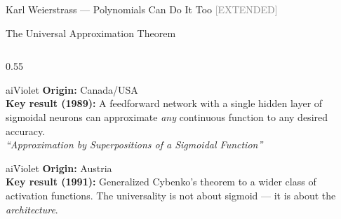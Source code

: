 \begin{frame}{Karl Weierstrass --- Polynomials Can Do It Too \hfill\small\textcolor{gray}{[EXTENDED]}}
\end{frame}

\begin{frame}[shrink=14]{The Universal Approximation Theorem}

  \begin{columns}[T]
    \begin{column}{0.55\textwidth}
      \begin{personbox}{aiViolet}
        \textbf{Origin:} Canada/USA\\[3pt]
        \textbf{Key result (1989):} A feedforward network with a single
        hidden layer of sigmoidal neurons can approximate \emph{any}
        continuous function to any desired accuracy.\\[3pt]
        \emph{``Approximation by Superpositions of a Sigmoidal Function''}
      \end{personbox}

      \vspace{0.3em}

      \begin{personbox}{aiViolet}
        \textbf{Origin:} Austria\\[3pt]
        \textbf{Key result (1991):} Generalized Cybenko's theorem to a
        wider class of activation functions. The universality is not
        about sigmoid --- it is about the \emph{architecture}.
      \end{personbox}
    \end{column}


\end{columns}
\end{frame}
